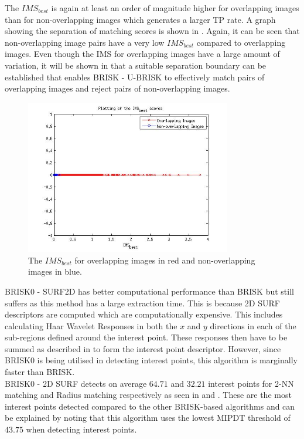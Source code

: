 \documentclass[11pt]{report}
\begin{document}
The $IMS_{best}$ is again at least an order of magnitude higher for overlapping images than for non-overlapping images which generates a larger TP rate. A graph showing the separation of matching scores is shown in . Again, it can be seen that non-overlapping image pairs have a very low $IMS_{best}$ compared to overlapping images. Even though the IMS for overlapping images have a large amount of variation, it will be shown in  that a suitable separation boundary can be established that enables BRISK - U-BRISK to effectively match pairs of overlapping images and reject pairs of non-overlapping images.\\

\begin{figure}
  \centering
    \includegraphics[width=0.8\textwidth]{../Drawings/Matching/MatchingScore_BRISK0UBRISK.jpg}
    \caption{The $IMS_{best}$ for overlapping images in red and non-overlapping images in blue.} 
    \label{fig:ms_ubrisk}
\end{figure}

BRISK0 - SURF2D has better computational performance than BRISK but still suffers as this method has a large extraction time. This is because 2D SURF descriptors are computed which are computationally expensive. This includes calculating Haar Wavelet Responses in both the $x$ and $y$ directions in each of the sub-regions defined around the interest point. These responses then have to be summed as described in  to form the interest point descriptor. However, since BRISK0 is being utilised in detecting interest points, this algorithm is marginally faster than BRISK.\\

BRISK0 - 2D SURF detects on average $64.71$ and $32.21$ interest points for 2-NN matching and Radius matching respectively as seen in  and . These are the most interest points detected compared to the other BRISK-based algorithms and can be explained by noting that this algorithm uses the lowest MIPDT threshold of $43.75$ when detecting interest points. \\
\end{document}
